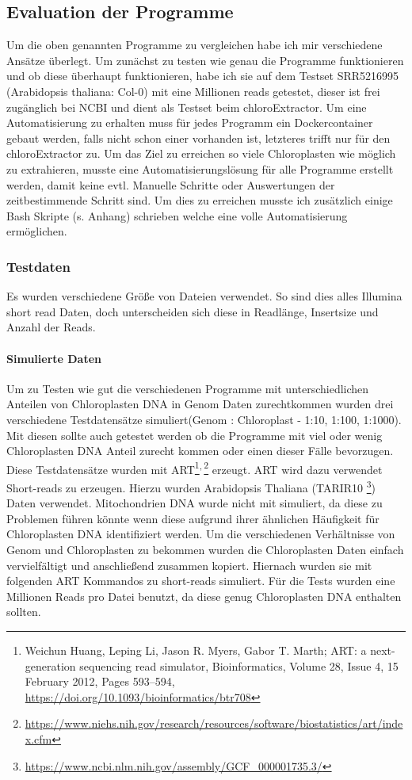 \documentclass{scrartcl}
\begin{document}
\subsection{Evaluation der Programme}
\label{sec-2-1}
Um die oben genannten Programme zu vergleichen habe ich mir verschiedene Ansätze überlegt.
Um zunächst zu testen wie genau die Programme funktionieren und ob diese überhaupt funktionieren,
habe ich sie auf dem Testset SRR5216995 (Arabidopsis thaliana: Col-0) mit eine Millionen reads getestet, 
dieser ist frei zugänglich bei NCBI und dient als Testset beim chloroExtractor\footnotemark[9]{}. Um eine 
Automatisierung zu erhalten muss für jedes Programm ein Dockercontainer gebaut werden, falls nicht 
schon einer vorhanden ist, letzteres trifft nur für den chloroExtractor zu. Um das Ziel zu erreichen
so viele Chloroplasten wie möglich zu extrahieren, musste eine Automatisierungslösung für alle Programme
erstellt werden, damit keine evtl. Manuelle Schritte oder Auswertungen der zeitbestimmende Schritt sind.
Um dies zu erreichen musste ich zusätzlich einige Bash Skripte (s. Anhang) schrieben welche eine volle
Automatisierung ermöglichen.   

\subsubsection{Testdaten}
\label{sec-2-1-1}
Es wurden verschiedene Größe von Dateien verwendet. So sind dies alles Illumina short read Daten, doch unterscheiden sich diese in Readlänge, Insertsize und Anzahl der Reads.

\paragraph{Simulierte Daten}
\label{sec-2-1-1-1}
Um zu Testen wie gut die verschiedenen Programme mit unterschiedlichen Anteilen von Chloroplasten DNA in
Genom Daten zurechtkommen wurden drei verschiedene Testdatensätze simuliert(Genom : Chloroplast - 1:10, 1:100, 1:1000). 
Mit diesen sollte auch getestet werden ob die Programme mit viel oder wenig Chloroplasten DNA Anteil zurecht kommen oder einen dieser Fälle 
bevorzugen. Diese Testdatensätze wurden mit ART\footnote{Weichun Huang, Leping Li, Jason R. Myers, Gabor T. Marth; ART: a next-generation sequencing read simulator, Bioinformatics, Volume 28, Issue 4, 15 February 2012, Pages 593–594, \url{https://doi.org/10.1093/bioinformatics/btr708}}\textsuperscript{,}\,\footnote{\url{https://www.niehs.nih.gov/research/resources/software/biostatistics/art/index.cfm}} erzeugt. ART wird dazu verwendet Short-reads zu erzeugen. 
Hierzu wurden Arabidopsis Thaliana (TARIR10 \footnote{\url{https://www.ncbi.nlm.nih.gov/assembly/GCF_000001735.3/}}) Daten verwendet. Mitochondrien DNA wurde nicht mit simuliert, da diese zu 
Problemen führen könnte wenn diese aufgrund ihrer ähnlichen Häufigkeit für Chloroplasten DNA identifiziert werden. 
Um die verschiedenen Verhältnisse von Genom und Chloroplasten zu bekommen wurden die Chloroplasten Daten einfach
vervielfältigt und anschließend zusammen kopiert. Hiernach wurden sie mit folgenden ART Kommandos zu short-reads simuliert.
Für die Tests wurden eine Millionen Reads pro Datei benutzt, da diese genug Chloroplasten DNA enthalten sollten.
\end{document}
